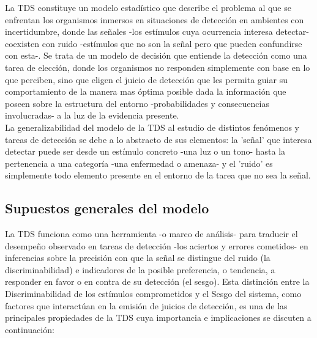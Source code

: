 La TDS constituye un modelo estadístico que describe el problema al que se enfrentan los organismos inmersos en situaciones de detección en ambientes con incertidumbre, donde las señales -los estímulos cuya ocurrencia interesa detectar- coexisten con ruido -estímulos que no son la señal pero que pueden confundirse con esta-. Se trata de un modelo de decisión que entiende la detección como una tarea de elección, donde los organismos no responden simplemente con base en lo que perciben, sino que eligen el juicio de detección que les permita guiar su comportamiento de la manera mas óptima posible dada la información que poseen sobre la estructura del entorno -probabilidades y consecuencias involucradas- a la luz de la evidencia presente.\\

La generalizabilidad del modelo de la TDS al estudio de distintos fenómenos y tareas de detección se debe a lo abstracto de sus elementos: la 'señal' que interesa detectar puede ser desde un estímulo concreto -una luz o un tono- hasta la pertenencia a una categoría -una enfermedad o amenaza- y el 'ruido' es simplemente todo elemento presente en el entorno de la tarea que no sea la señal.\\ 

\subsection{Supuestos generales del modelo}

La TDS funciona como una herramienta -o marco de análisis- para traducir el desempeño observado en tareas de detección -los aciertos y errores cometidos- en inferencias sobre la precisión con que la señal se distingue del ruido (la discriminabilidad) e indicadores de la posible preferencia, o tendencia, a responder en favor o en contra de su detección (el sesgo). Esta distinción entre la Discriminabilidad de los estímulos comprometidos y el Sesgo del sistema, como factores que interactúan en la emisión de juicios de detección, es una de las principales propiedades de la TDS cuya importancia e implicaciones se discuten a continuación:\\

